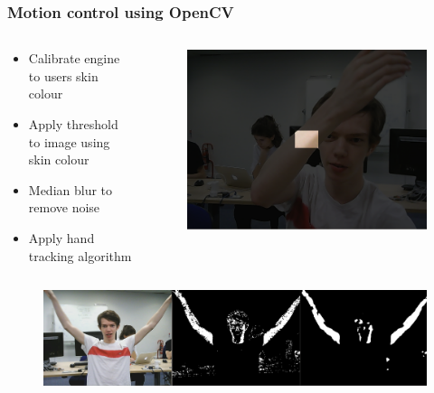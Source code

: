 \documentclass{beamer}
\begin{document}
\begin{frame}
\frametitle{Motion control using OpenCV}
\begin{columns}
	\begin{column}{0.65\textwidth}
		\begin{itemize}
			\item Calibrate engine to users skin colour
			\item Apply threshold to image using skin colour
			\item Median blur to remove noise
			\item Apply hand tracking algorithm
		\end{itemize}
	\end{column}
	\begin{column}{0.35\textwidth}
		\begin{figure}
			\includegraphics[width=\textwidth]{Presentation/calibration.png}
		\end{figure}
	\end{column}
\end{columns}
\begin{figure}
			\includegraphics[width=\textwidth]{Presentation/opencv.png}
		\end{figure}
\end{frame}
\end{document}
